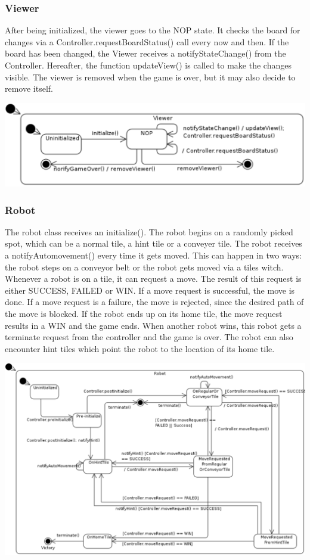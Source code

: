 	\subsubsection{Viewer}
	After being initialized, the viewer goes to the NOP state. It checks the board for changes via a Controller.requestBoardStatus() call every now and then. If the board has been changed, the Viewer receives a notifyStateChange() from the Controller. Hereafter, the function updateView() is called to make the changes visible. The viewer is removed when the game is over, but it may also decide to remove itself.
	
	\includegraphics[width=\linewidth]{statecharts/view.pdf}

	\subsubsection{Robot}
	The robot class receives an initialize(). The robot begins on a randomly picked spot, which can be a normal tile, a hint tile or a conveyer tile. The robot receives a notifyAutomovement() every time it gets moved. This can happen in two ways: the robot steps on a conveyor belt or the robot gets moved via a tiles witch. Whenever a robot is on a tile, it can request a move. The result of this request is either SUCCESS, FAILED or WIN. If a move request is successful, the move is done. If a move request is a failure, the move is rejected, since the desired path of the move is blocked. If the robot ends up on its home tile, the move request results in a WIN and the game ends. When another robot wins, this robot gets a terminate request from the controller and the game is over. The robot can also encounter hint tiles which point the robot to the location of its home tile.
	
	\includegraphics[width=\linewidth]{statecharts/robot.pdf}
	

	
